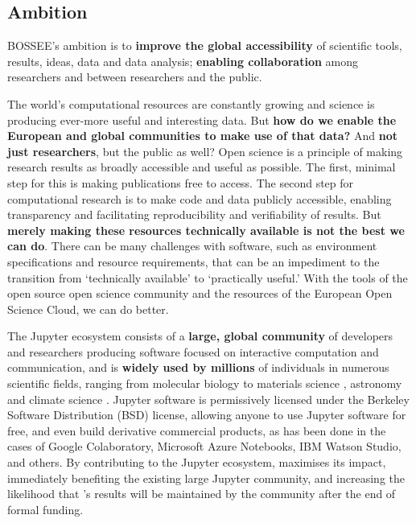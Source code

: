 
\subsection{Ambition}



BOSSEE's ambition is to \textbf{improve the global accessibility} of scientific
tools, results, ideas, data and data analysis;
\textbf{enabling collaboration} among researchers and between researchers and the public.

The world's computational resources are
constantly growing and science is producing ever-more useful and
interesting data.  But \textbf{how do we enable the European and global
communities to make use of that data?}  And \textbf{not just researchers}, but
the public as well?  Open science is a principle of making research
results as broadly accessible and useful as possible.  The first,
minimal step for this is making publications free to access.  The
second step for computational research is to make code and data
publicly accessible, enabling transparency and facilitating
reproducibility and verifiability of results.  But \textbf{merely making these
resources technically available is not the best we can do}.  There can
be many challenges with software, such as environment specifications
and resource requirements, that can be an impediment to the transition
from `technically available' to `practically useful.'  With the tools
of the open source open science community and the resources of the
European Open Science Cloud, we can do better.

The Jupyter ecosystem consists of a \textbf{large, global community} of
developers and researchers producing software focused on interactive
computation and communication, and is \textbf{widely used by millions} of
individuals in numerous scientific fields, ranging from molecular
biology \cite{Wang2016} to materials science \cite{Hughes2014},
astronomy \cite{Baron2017} and climate science
\cite{Laken2015,Laken2015b}.  Jupyter software is permissively
licensed under the Berkeley Software Distribution (BSD) license,
allowing anyone to use Jupyter software for free, and even build
derivative commercial products, as has been done in the cases of
Google Colaboratory, Microsoft Azure Notebooks, IBM Watson Studio, and
others.  By contributing to the Jupyter ecosystem,
\TheProject maximises its impact, immediately benefiting the existing
large Jupyter community, and increasing the likelihood that
\TheProject's results will be maintained by the community after the
end of formal funding.


